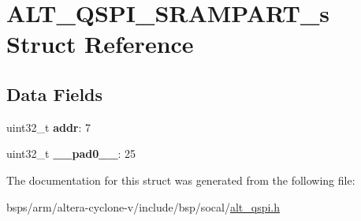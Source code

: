 \hypertarget{structALT__QSPI__SRAMPART__s}{}\section{A\+L\+T\+\_\+\+Q\+S\+P\+I\+\_\+\+S\+R\+A\+M\+P\+A\+R\+T\+\_\+s Struct Reference}
\label{structALT__QSPI__SRAMPART__s}
\subsection*{Data Fields}
\begin{DoxyCompactItemize}
\item 
\mbox{\label{structALT__QSPI__SRAMPART__s_a6b815e65b98c1ca384e2c459f3b5dc14}} 
uint32\+\_\+t {\bfseries addr}\+: 7
\item 
\mbox{\label{structALT__QSPI__SRAMPART__s_aee3d834a73384afc0de8b78d60e26ebb}} 
uint32\+\_\+t {\bfseries \+\_\+\+\_\+pad0\+\_\+\+\_\+}\+: 25
\end{DoxyCompactItemize}


The documentation for this struct was generated from the following file\+:\begin{DoxyCompactItemize}
\item 
bsps/arm/altera-\/cyclone-\/v/include/bsp/socal/\mbox{\hyperlink{include_2bsp_2socal_2alt__qspi_8h}{alt\+\_\+qspi.\+h}}\end{DoxyCompactItemize}
